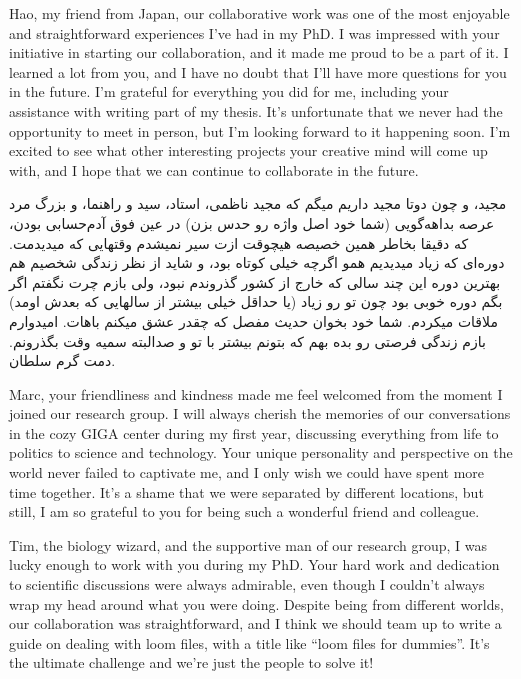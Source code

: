 Hao, my friend from Japan, our collaborative work was one of the most enjoyable and straightforward experiences I've had in my PhD. I was impressed with your initiative in starting our collaboration, and it made me proud to be a part of it. I learned a lot from you, and I have no doubt that I'll have more questions for you in the future. I'm grateful for everything you did for me, including your assistance with writing part of my thesis. It's unfortunate that we never had the opportunity to meet in person, but I'm looking forward to it happening soon. I'm excited to see what other interesting projects your creative mind will come up with, and I hope that we can continue to collaborate in the future.

\begin{flushright}
\foreignlanguage{persian}
{
مجید، و چون دوتا مجید داریم میگم که مجید ناظمی، استاد، سید و راهنما، و بزرگ مرد عرصه بداهه‌گویی (شما خود اصل واژه رو حدس بزن) در عین فوق آدم‌حسابی بودن، که دقیقا بخاطر همین خصیصه هیچوقت ازت سیر نمیشدم وقتهایی که میدیدمت. دوره‌ای که زیاد میدیدیم همو اگرچه خیلی کوتاه بود، و شاید از نظر زندگی شخصیم هم بهترین دوره این چند سالی که خارج از کشور گذروندم نبود، ولی بازم چرت نگفتم اگر بگم دوره خوبی بود چون تو رو زیاد (یا حداقل خیلی بیشتر از سالهایی که بعدش اومد) ملاقات میکردم. شما خود بخوان حدیث مفصل که چقدر عشق میکنم باهات. امیدوارم بازم زندگی فرصتی رو بده بهم که بتونم بیشتر با تو و صدالبته سمیه وقت بگذرونم. دمت گرم سلطان.
}
\end{flushright}

Marc, your friendliness and kindness made me feel welcomed from the moment I joined our research group. I will always cherish the memories of our conversations in the cozy GIGA center during my first year, discussing everything from life to politics to science and technology. Your unique personality and perspective on the world never failed to captivate me, and I only wish we could have spent more time together. It's a shame that we were separated by different locations, but still, I am so grateful to you for being such a wonderful friend and colleague.

Tim, the biology wizard, and the supportive man of our research group, I was lucky enough to work with you during my PhD. Your hard work and dedication to scientific discussions were always admirable, even though I couldn't always wrap my head around what you were doing. Despite being from different worlds, our collaboration was straightforward, and I think we should team up to write a guide on dealing with loom files, with a title like ``loom files for dummies''. It's the ultimate challenge and we're just the people to solve it!

